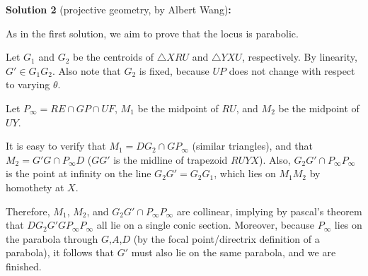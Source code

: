 \documentclass{article}
\newcommand{\V}{

\vspace{\baselineskip}

}
\begin{document}
\begin{solution}
\textbf{Solution 2} (projective geometry, by Albert Wang)\textbf{:}\V

As in the first solution, we aim to prove that the locus is parabolic.\V

Let $G_1$ and $G_2$ be the centroids of $\triangle{XRU}$ and $\triangle{YXU}$, respectively. By linearity, $G'\in G_1G_2$. Also note that $G_2$ is fixed, because $UP$ does not change with respect to varying $\theta$.\V

Let $P_\infty = RE\cap GP\cap UF$, $M_1$ be the midpoint of $RU$, and $M_2$ be the midpoint of $UY$.\V

It is easy to verify that $M_1 = DG_2\cap GP_\infty$ (similar triangles), and that $M_2 = G'G\cap P_\infty D$ ($GG'$ is the midline of trapezoid $RUYX$). Also, $G_2G'\cap P_\infty P_\infty$ is the point at infinity on the line $G_2G' = G_2G_1$, which lies on $M_1M_2$ by homothety at $X$. \V

Therefore, $M_1$, $M_2$, and $G_2G'\cap P_\infty P_\infty$ are collinear, implying by pascal's theorem that $DG_2G'GP_\infty P_\infty$ all lie on a single conic section. Moreover, because $P_\infty$ lies on the parabola through $G$,$A$,$D$ (by the focal point/directrix definition of a parabola), it follows that $G'$ must also lie on the same parabola, and we are finished.
\end{solution}
\end{document}
